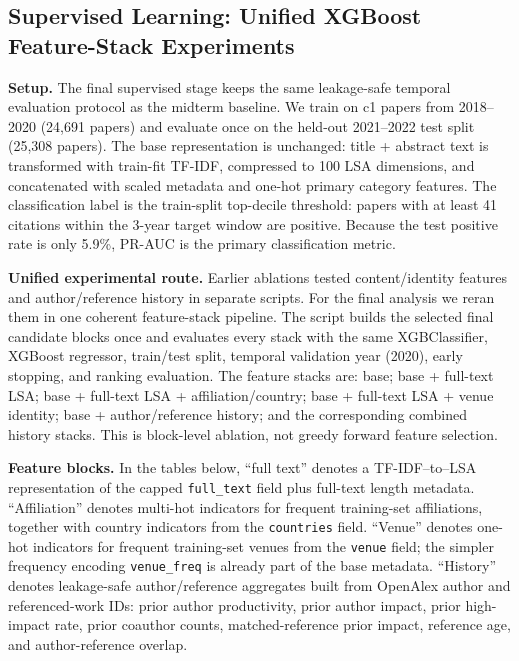 
\subsection{Supervised Learning: Unified XGBoost Feature-Stack Experiments}

\textbf{Setup.} The final supervised stage keeps the same leakage-safe
temporal evaluation protocol as the midterm baseline. We train on c1 papers
from 2018--2020 (24{,}691 papers) and evaluate once on the held-out
2021--2022 test split (25{,}308 papers). The base representation is unchanged:
title + abstract text is transformed with train-fit TF-IDF, compressed to 100
LSA dimensions, and concatenated with scaled metadata and one-hot primary
category features. The classification label is the train-split top-decile
threshold: papers with at least 41 citations within the 3-year target window
are positive. Because the test positive rate is only 5.9\%, PR-AUC is the
primary classification metric.

\textbf{Unified experimental route.} Earlier ablations tested content/identity
features and author/reference history in separate scripts. For the final
analysis we reran them in one coherent feature-stack pipeline. The script
builds the selected final candidate blocks once and evaluates every stack with the same
XGBClassifier, XGBoost regressor, train/test split, temporal validation year
(2020), early stopping, and ranking evaluation. The feature stacks are:
base; base + full-text LSA; base + full-text LSA + affiliation/country;
base + full-text LSA + venue identity; base + author/reference history; and
the corresponding combined history stacks. This is block-level ablation, not
greedy forward feature selection.

\textbf{Feature blocks.} In the tables below, ``full text'' denotes a
TF-IDF--to--LSA representation of the capped \texttt{full\_text} field plus
full-text length metadata. ``Affiliation'' denotes multi-hot indicators for
frequent training-set affiliations, together with country indicators from the
\texttt{countries} field. ``Venue'' denotes one-hot indicators for frequent
training-set venues from the \texttt{venue} field; the simpler frequency
encoding \texttt{venue\_freq} is already part of the base metadata. ``History''
denotes leakage-safe author/reference aggregates built from OpenAlex author and
referenced-work IDs: prior author productivity, prior author impact, prior
high-impact rate, prior coauthor counts, matched-reference prior impact,
reference age, and author-reference overlap.


